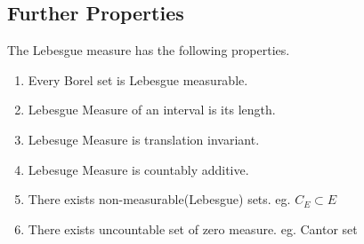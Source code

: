 \subsection{Further Properties}
	The Lebesgue measure has the following properties.
	\begin{enumerate}
		\item Every Borel set is Lebesgue measurable.
		\item Lebesgue Measure of an interval is its length.
		\item Lebesuge Measure is translation invariant.
		\item Lebesuge Measure is countably additive.
		\item There exists non-measurable(Lebesgue) sets. eg. $C_E \subset E$
		\item There exists uncountable set of zero measure. eg. Cantor set
	\end{enumerate}
